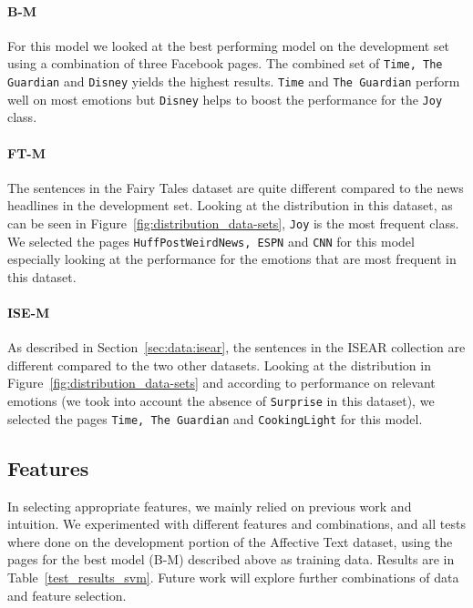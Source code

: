 \documentclass[11pt]{article}
\begin{document}
\paragraph{B-M}
For this model we looked at the best performing model on the development set using a combination of three Facebook pages. The combined set of \texttt{Time, The Guardian} and \texttt{Disney} yields the highest results. \texttt{Time} and \texttt{The Guardian} perform well on most emotions but \texttt{Disney} helps to boost the performance for the \texttt{Joy} class.


\paragraph{FT-M}
The sentences in the Fairy Tales dataset are quite different compared to the news headlines in the development set. Looking at the distribution in this dataset, as can be seen in Figure~\ref{fig:distribution_data-sets}, \texttt{Joy} is the most frequent class. We selected the pages \texttt{HuffPostWeirdNews, ESPN} and \texttt{CNN} for this model especially looking at the performance for the emotions that are most frequent in this dataset.

\paragraph{ISE-M}
As described in Section~\ref{sec:data:isear}, the sentences in the ISEAR collection are different compared to the two other datasets. Looking at the distribution in Figure~\ref{fig:distribution_data-sets} and according to performance on relevant emotions (we took into account the absence of \texttt{Surprise} in this dataset), we selected the pages \texttt{Time, The Guardian} and \texttt{CookingLight} for this model. 


\subsection{Features}
In selecting appropriate features, we mainly relied on previous work and intuition. We experimented with different features and combinations, and all tests where done on the development portion of the Affective Text dataset, using the pages for the best model (B-M) described above as training data. %
Results are in Table~\ref{test_results_svm}.
Future work will explore further combinations of data and feature selection.
\end{document}
